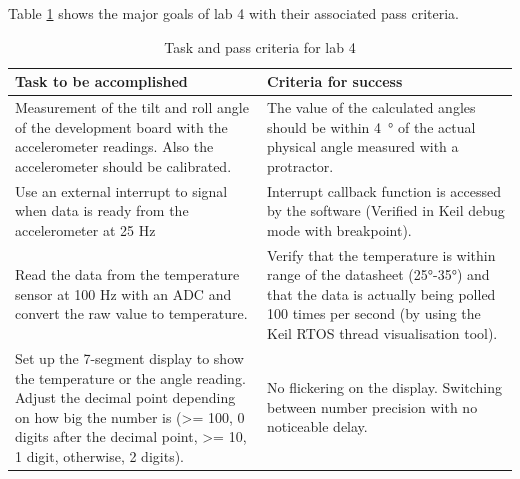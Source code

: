 \documentclass[12pt]{article}
\begin{document}
Table \ref{Table_tasks} shows the major goals of lab 4 with their associated pass criteria.
\begin{table}[!h]
\centering
\caption{Task and pass criteria for lab 4}
\label{Table_tasks}
\begin{tabular}{|p{0.5\linewidth}|p{0.5\linewidth}|}
\hline
\textbf{Task to be accomplished}                                                                                                                                                                                                              & \textbf{Criteria for success}                                                                                                                                                                                            \\ \hline
Measurement of the tilt and roll angle of the development board with the accelerometer readings. Also the accelerometer should be calibrated.                                                                                                 & The value of the calculated angles should be within \SI{4}{\degree} of the actual physical angle measured with a protractor.                                                                                                          \\ \hline
Use an external interrupt to signal when data is ready from the accelerometer at 25 Hz                                                                                                                                                       & Interrupt callback function is accessed by the software (Verified in Keil debug mode with breakpoint).                                                                                                                   \\ \hline
Read the data from the temperature sensor at 100 Hz with an ADC and convert the raw value to temperature.                                                                                                                                     & Verify that the temperature is within range of the datasheet (25°-35°) and that the data is actually being polled 100 times per second (by using the Keil RTOS thread visualisation tool).                               \\ \hline
Set up the 7-segment display to show the temperature or the angle reading. Adjust the decimal point depending on how big the number is (\textgreater= 100, 0 digits after the decimal point, \textgreater= 10, 1 digit, otherwise, 2 digits). & No flickering on the display. Switching between number precision with no noticeable delay.                                                                                                                               \\ \hline

\end{tabular}
\end{table}
\end{document}
